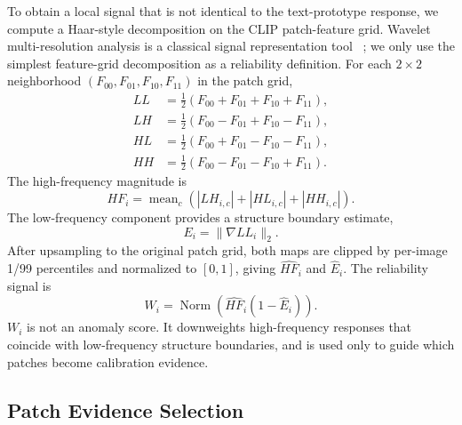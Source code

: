 To obtain a local signal that is not identical to the text-prototype response,
we compute a Haar-style decomposition on the CLIP patch-feature grid. Wavelet
multi-resolution analysis is a classical signal representation tool~
\cite{daubechies1988orthonormal,mallat1989theory}; we only use the simplest
feature-grid decomposition as a reliability definition. For each $2\times2$
neighborhood $(F_{00},F_{01},F_{10},F_{11})$ in the patch grid,
\begin{align}
  LL &= \frac{1}{2}(F_{00}+F_{01}+F_{10}+F_{11}), \\
  LH &= \frac{1}{2}(F_{00}-F_{01}+F_{10}-F_{11}), \\
  HL &= \frac{1}{2}(F_{00}+F_{01}-F_{10}-F_{11}), \\
  HH &= \frac{1}{2}(F_{00}-F_{01}-F_{10}+F_{11}).
\end{align}
The high-frequency magnitude is
\begin{equation}
  HF_i=\operatorname{mean}_c(|LH_{i,c}|+|HL_{i,c}|+|HH_{i,c}|).
\end{equation}
The low-frequency component provides a structure boundary estimate,
\begin{equation}
  E_i=\|\nabla LL_i\|_2 .
\end{equation}
After upsampling to the original patch grid, both maps are clipped by per-image
1/99 percentiles and normalized to $[0,1]$, giving $\widehat{HF}_i$ and
$\widehat{E}_i$. The reliability signal is
\begin{equation}
  W_i=\operatorname{Norm}\left(\widehat{HF}_i(1-\widehat{E}_i)\right).
  \label{eq:reliability}
\end{equation}
$W_i$ is not an anomaly score. It downweights high-frequency responses that
coincide with low-frequency structure boundaries, and is used only to guide
which patches become calibration evidence.

\subsection{Patch Evidence Selection}

